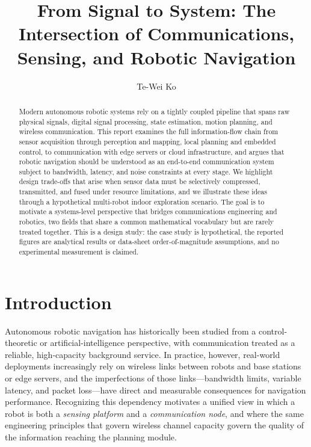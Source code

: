 \title{From Signal to System: The Intersection of Communications, Sensing, and Robotic Navigation}
\author{Te-Wei Ko}
\date{}

\maketitle

\begin{abstract}
Modern autonomous robotic systems rely on a tightly coupled pipeline that spans raw physical signals,
digital signal processing, state estimation, motion planning, and wireless communication.
This report examines the full information-flow chain from sensor acquisition through
perception and mapping, local planning and embedded control, to communication with
edge servers or cloud infrastructure, and argues that robotic navigation should be
understood as an end-to-end communication system subject to bandwidth, latency, and
noise constraints at every stage.
We highlight design trade-offs that arise when sensor data must be selectively compressed,
transmitted, and fused under resource limitations, and we illustrate these ideas through
a hypothetical multi-robot indoor exploration scenario.
The goal is to motivate a systems-level perspective that bridges communications engineering
and robotics, two fields that share a common mathematical vocabulary but are rarely treated together.
This is a design study: the case study is hypothetical, the reported figures are analytical
results or data-sheet order-of-magnitude assumptions, and no experimental measurement is claimed.
\end{abstract}

\section{Introduction}

Autonomous robotic navigation has historically been studied from a control-theoretic or
artificial-intelligence perspective, with communication treated as a reliable, high-capacity
background service.
In practice, however, real-world deployments increasingly rely on wireless links between
robots and base stations or edge servers, and the imperfections of those links---bandwidth
limits, variable latency, and packet loss---have direct and measurable consequences for
navigation performance.
Recognizing this dependency motivates a unified view in which a robot is both a
\emph{sensing platform} and a \emph{communication node}, and where the same engineering
principles that govern wireless channel capacity govern the quality of the information
reaching the planning module.

